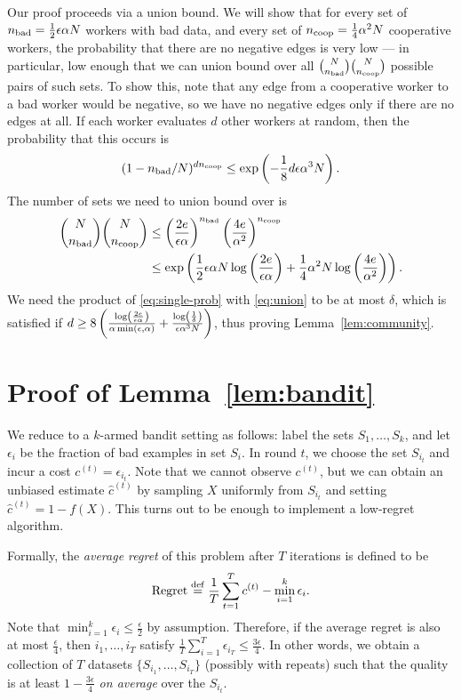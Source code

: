 \documentclass[anon,12pt]{colt2016} %
\newcommand{\goodfrac}{\alpha}
\newcommand{\quality}{\epsilon}
\newcommand{\failprob}{\delta}
\begin{document}
Our proof proceeds via a union bound. 
We will show that for every set of $\nbad = \frac{1}{2}\quality\goodfrac N$ 
workers with bad data, and every set of $\ncoop = \frac{1}{4}\goodfrac^2 N$ 
cooperative workers, the probability that there are no negative 
edges is very low --- in particular, low enough that we can 
union bound over all $\binom{N}{n_{\mathrm{bad}}}\binom{N}{n_{\mathrm{coop}}}$ possible 
pairs of such sets. To show this, note that any edge from a cooperative 
worker to a bad worker would be negative, so we have no negative edges only 
if there are no edges at all. If each worker evaluates $d$ other workers at 
random, then the probability that this occurs is 
\begin{equation}
\label{eq:single-prob}
(1-\nbad/N)^{d\ncoop} \leq \exp\p{-\frac{1}{8}d\quality\goodfrac^3N}. 
\end{equation}
The number of sets we need to union bound over is 
\begin{align}\binom{N}{\nbad}\binom{N}{\ncoop} &\leq \p{\frac{2e}{\quality\goodfrac}}^{\nbad}\p{\frac{4e}{\goodfrac^2}}^{\ncoop} \\
\label{eq:union} &\leq \exp\p{\frac{1}{2}\quality\goodfrac N\log\p{\frac{2e}{\quality\goodfrac}} + \frac{1}{4}\goodfrac^2 N\log\p{\frac{4e}{\goodfrac^2}}}.
\end{align}
We need the product of \eqref{eq:single-prob} with \eqref{eq:union} to be at most 
$\failprob$, which is satisfied if 
$d \geq 8\p{\frac{\log\p{\frac{2e}{\quality\goodfrac}}}{\goodfrac\min\p{\quality,\goodfrac}} + \frac{\log\p{\frac{1}{\failprob}}}{\quality\goodfrac^3N}}$,
thus proving Lemma~\ref{lem:community}.

\section{Proof of Lemma~\ref{lem:bandit}}
\label{sec:bandit-proof}

We reduce to a $k$-armed bandit setting as follows: 
label the sets $S_1, \ldots, S_k$, and let $\epsilon_i$ 
be the fraction of bad examples in set $S_i$. 
In round $t$, we choose the set $S_{i_t}$ and incur 
a cost $c^{(t)} = \epsilon_{i_t}$. Note that we cannot observe 
$c^{(t)}$, but we can obtain an unbiased estimate 
$\hat{c}^{(t)}$ by sampling $X$ uniformly from $S_{i_t}$ 
and setting $\hat{c}^{(t)} = 1 - f(X)$. This turns out to be 
enough to implement a low-regret algorithm.

Formally, the \emph{average regret} of this problem after 
$T$ iterations is defined to be
\begin{equation}
\label{eq:regret-def}
\operatorname{Regret} \stackrel{\mathrm{def}}{=} \frac{1}{T}\sum_{t=1}^T c^{(t)} - \min_{i=1}^k \epsilon_i.
\end{equation}
Note that $\min_{i=1}^k \epsilon_i \leq \frac{\epsilon}{2}$ by assumption. 
Therefore, if the average regret is also at most $\frac{\epsilon}{4}$, 
then $i_1, \ldots, i_T$ satisfy $\frac{1}{T}\sum_{i=1}^T \epsilon_{i_T} \leq \frac{3\epsilon}{4}$. 
In other words, we obtain a collection of $T$ datasets 
$\{S_{i_1}, \ldots, S_{i_T}\}$ (possibly with repeats) 
such that the quality is at least $1-\frac{3\epsilon}{4}$ \emph{on average} over the $S_{i_t}$.
\end{document}
